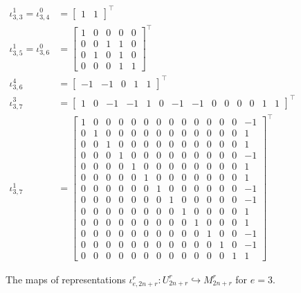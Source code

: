 \documentclass{amsart}
\begin{document}
\begin{figure}[h]
\begin{align*} 
  \iota_{3,3}^1 = \iota_{3,4}^0 &=  
\begin{bmatrix}
  1 & 1
\end{bmatrix}^\intercal\\
\iota_{3,5}^1 = \iota_{3,6}^0&=  
\begin{bmatrix}
  1 & 0 & 0 & 0 & 0\\
  0 & 0 & 1 & 1 & 0\\
  0 & 1 & 0 & 1 & 0\\
  0 & 0 & 0 & 1 & 1
\end{bmatrix}^\intercal\\
\iota_{3,6}^4&=  
\begin{bmatrix}
  -1 & -1 & 0 & 1 & 1
\end{bmatrix}^\intercal\\
\iota_{3,7}^3&=  
\begin{bmatrix}
 1 & 0 &-1 &-1 & 1 & 0 & -1 & -1 & 0 & 0 & 0 & 0 & 1 & 1
\end{bmatrix}^\intercal\\
\iota_{3,7}^1&=  
\begin{bmatrix}
 1 & 0 & 0 & 0 & 0 & 0 & 0 & 0 & 0 & 0 & 0 & 0 & 0 &-1\\
 0 & 1 & 0 & 0 & 0 & 0 & 0 & 0 & 0 & 0 & 0 & 0 & 0 & 1\\
 0 & 0 & 1 & 0 & 0 & 0 & 0 & 0 & 0 & 0 & 0 & 0 & 0 & 1\\
 0 & 0 & 0 & 1 & 0 & 0 & 0 & 0 & 0 & 0 & 0 & 0 & 0 &-1\\
 0 & 0 & 0 & 0 & 1 & 0 & 0 & 0 & 0 & 0 & 0 & 0 & 0 & 1\\
 0 & 0 & 0 & 0 & 0 & 1 & 0 & 0 & 0 & 0 & 0 & 0 & 0 & 1\\
 0 & 0 & 0 & 0 & 0 & 0 & 1 & 0 & 0 & 0 & 0 & 0 & 0 &-1\\
 0 & 0 & 0 & 0 & 0 & 0 & 0 & 1 & 0 & 0 & 0 & 0 & 0 &-1\\
 0 & 0 & 0 & 0 & 0 & 0 & 0 & 0 & 1 & 0 & 0 & 0 & 0 & 1\\
 0 & 0 & 0 & 0 & 0 & 0 & 0 & 0 & 0 & 1 & 0 & 0 & 0 & 1\\
 0 & 0 & 0 & 0 & 0 & 0 & 0 & 0 & 0 & 0 & 1 & 0 & 0 &-1\\
 0 & 0 & 0 & 0 & 0 & 0 & 0 & 0 & 0 & 0 & 0 & 1 & 0 &-1\\
 0 & 0 & 0 & 0 & 0 & 0 & 0 & 0 & 0 & 0 & 0 & 0 & 1 & 1
\end{bmatrix}^\intercal
\end{align*}
\caption{The maps of representations $\iota_{e,2n+r}^r:U_{2n +r}^r \hookrightarrow M_{2n + r}^r$ for $e = 3$.}
\label{Composition series e=3}
\end{figure}
  
\end{document}
